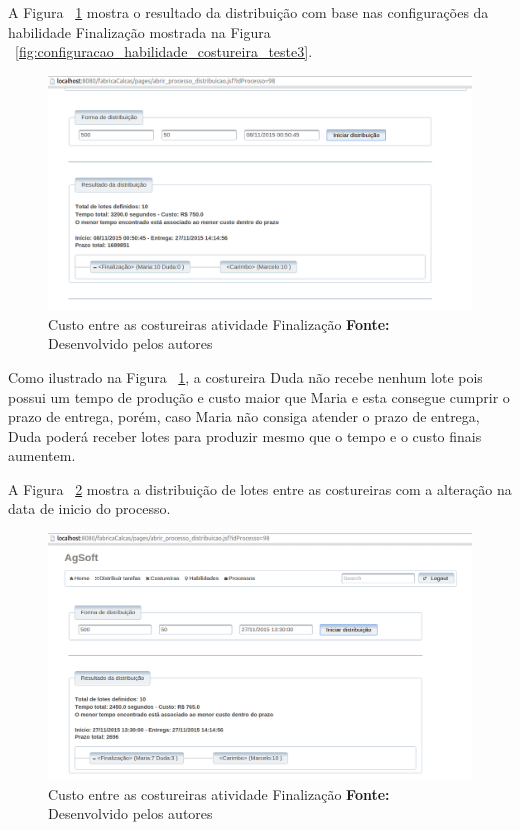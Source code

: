 \par A Figura ~\ref{fig:resultado1_teste3} mostra o resultado da distribuição
com base nas configurações da habilidade Finalização mostrada na Figura
~\ref{fig:configuracao_habilidade_costureira_teste3}.

\begin{figure}[h!]
	\centerline{\includegraphics[scale=0.4]{./imagens/resultado1_teste3.png}}
	\caption[Custo entre as costureiras atividade Finalização]
	{Custo entre as costureiras atividade Finalização \textbf{Fonte:} Desenvolvido pelos autores}
	\label{fig:resultado1_teste3}
\end{figure}

\par Como ilustrado na Figura ~\ref{fig:resultado1_teste3}, a costureira Duda
não recebe nenhum lote pois possui um tempo de produção e custo maior que Maria e
esta consegue cumprir o prazo de entrega, porém, caso Maria não consiga atender
o prazo de entrega, Duda poderá receber lotes para produzir mesmo que o tempo e
o custo finais aumentem.

A Figura ~\ref{fig:resultado2_teste3} mostra a distribuição de lotes entre as
costureiras com a alteração na data de inicio do processo.

\begin{figure}[h!]
	\centerline{\includegraphics[scale=0.4]{./imagens/resultado2_teste3.png}}
	\caption[Custo entre as costureiras atividade Finalização]
	{Custo entre as costureiras atividade Finalização \textbf{Fonte:} Desenvolvido pelos autores}
	\label{fig:resultado2_teste3}
\end{figure}

